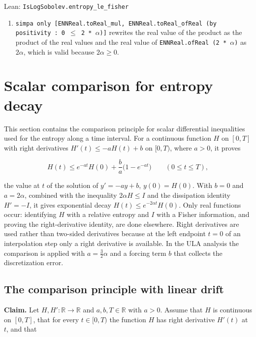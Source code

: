 \documentclass[11pt,a4paper]{report}
\begin{document}
\begin{leanbox}{Lean: \texttt{IsLogSobolev.\allowbreak{}entropy\_\allowbreak{}le\_\allowbreak{}fisher}}
\begin{enumerate}
\item \texttt{simpa only [ENNReal.\allowbreak{}to\allowbreak{}Real\_\allowbreak{}mul, ENNReal.\allowbreak{}to\allowbreak{}Real\_\allowbreak{}of\allowbreak{}Real (by positivity : 0 \ensuremath{\le} 2 * \ensuremath{\alpha})]} rewrites the real value of the product as the product of the real values and the real value of \texttt{ENNReal.\allowbreak{}of\allowbreak{}Real (2 * \ensuremath{\alpha})} as \(2\alpha\), which is valid because \(2\alpha\ge0\).

\end{enumerate}
\end{leanbox}
\section{\texorpdfstring{Scalar comparison for entropy decay}{Scalar comparison for entropy decay}}
\label{proof-module-UnadjustedLangevin-LSI-EntropyDecay-lean}


This section contains the comparison principle for scalar differential inequalities used for the entropy along a time interval. For a continuous function \(H\) on \([0,T]\) with right derivatives \(H'(t)\le-aH(t)+b\) on \([0,T)\), where \(a>0\), it proves


\[H(t)\le e^{-at}H(0)+\frac ba\bigl(1-e^{-at}\bigr)\qquad(0\le t\le T),\]


the value at \(t\) of the solution of \(y'=-ay+b\), \(y(0)=H(0)\). With \(b=0\) and \(a=2\alpha\), combined with the inequality \(2\alpha H\le I\) and the dissipation identity \(H'=-I\), it gives exponential decay \(H(t)\le e^{-2\alpha t}H(0)\). Only real functions occur: identifying \(H\) with a relative entropy and \(I\) with a Fisher information, and proving the right-derivative identity, are done elsewhere. Right derivatives are used rather than two-sided derivatives because at the left endpoint \(t=0\) of an interpolation step only a right derivative is available. In the ULA analysis the comparison is applied with \(a=\frac32\alpha\) and a forcing term \(b\) that collects the discretization error.

\subsection{\texorpdfstring{The comparison principle with linear drift}{The comparison principle with linear drift}}
\label{report-step-UnadjustedLangevin-LSI-EntropyDecay-lean-1}


\textbf{Claim.} Let \(H,H':\mathbb R\to\mathbb R\) and \(a,b,T\in\mathbb R\) with \(a>0\). Assume that \(H\) is continuous on \([0,T]\), that for every \(t\in[0,T)\) the function \(H\) has right derivative \(H'(t)\) at \(t\), and that
\end{document}

